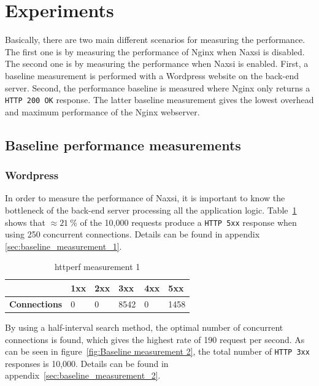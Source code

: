 \documentclass[Experiments]{subfiles}
\begin{document}
\section{Experiments}

\label{sec:Measurements}
Basically, there are two main different scenarios for measuring the performance. The first one is by measuring the performance of Nginx when Naxsi is disabled. The second one is by measuring the performance when Naxsi is enabled.  First, a baseline measurement is performed with a Wordpress website on the back-end server. Second, the performance baseline is measured where Nginx only returns a \verb+HTTP 200 OK+ response. The latter baseline measurement gives the lowest overhead and maximum performance of the Nginx webserver.

\subsection{Baseline performance measurements}

\subsubsection{Wordpress}
\label{sec:Baseline performance measurement}
In order to measure the performance of Naxsi, it is important to know the bottleneck of the back-end server processing all the application logic. Table~\ref{fig:Baseline measurement 1} shows that $\approx 21~\%$ of the 10,000 requests produce a \verb+HTTP 5xx+ response when using 250 concurrent connections. Details can be found in appendix \ref{sec:baseline_measurement_1}.

\begin{table}[H]
\caption{httperf measurement 1}
\begin{tabular}{|p{2cm}|p{}|p{}|p{}|p{}|p{}|}
\hline
 & \textbf{1xx} & \textbf{2xx} & \textbf{3xx} & \textbf{4xx} & \textbf{5xx} \\ \hline
\textbf{Connections} & 0 & 0 & 8542 & 0 & 1458 \\ \hline
\end{tabular}
\label{fig:Baseline measurement 1}
\end{table}

By using a half-interval search method, the optimal number of concurrent connections is found, which gives the highest rate of 190 request per second. As can be seen in figure~\ref{fig:Baseline measurement 2}, the total number of \verb+HTTP 3xx+ responses is 10,000. Details can be found in appendix~\ref{sec:baseline_measurement_2}.
\end{document}
